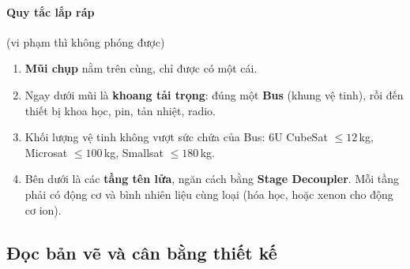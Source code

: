 \documentclass[11pt]{article}
\begin{document}
\paragraph{Quy tắc lắp ráp} (vi phạm thì không phóng được)
\begin{enumerate}
  \item \textbf{Mũi chụp} nằm trên cùng, chỉ được có một cái.
  \item Ngay dưới mũi là \textbf{khoang tải trọng}: đúng một \textbf{Bus} (khung vệ tinh), rồi đến thiết bị khoa học, pin, tản nhiệt, radio.
  \item Khối lượng vệ tinh không vượt sức chứa của Bus: 6U CubeSat $\le 12$\,kg, Microsat $\le 100$\,kg, Smallsat $\le 180$\,kg.
  \item Bên dưới là các \textbf{tầng tên lửa}, ngăn cách bằng \textbf{Stage Decoupler}. Mỗi tầng phải có động cơ và bình nhiên liệu cùng loại (hóa học, hoặc xenon cho động cơ ion).
\end{enumerate}

\subsection{Đọc bản vẽ và cân bằng thiết kế}
\end{document}
